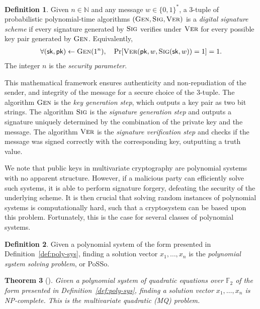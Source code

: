 \documentclass[12pt, a4paper, oneside]{memoir}
\newtheorem{theorem}{Theorem}[section]
\theoremstyle{definition}
\newtheorem{definition}[theorem]{Definition}
\begin{document}
\begin{definition}
  Given $n \in \mathbb{N}$ and any message $w \in \{0, 1\}^{*}$, a $3$-tuple of probabilistic polynomial-time algorithms $(\textsc{Gen}, \textsc{Sig}, \textsc{Ver})$ is a \emph{digital signature scheme} if every signature generated by $\textsc{Sig}$ verifies under $\textsc{Ver}$ for every possible key pair generated by $\textsc{Gen}$. Equivalently,
  \begin{align}
     \forall (\mathsf{sk}, \mathsf{pk}) \leftarrow \textsc{Gen}(1^{n}),
       \quad \Pr[\textsc{Ver}(\mathsf{pk}, w, \textsc{Sig}(\mathsf{sk}, w)) = 1] = 1.
  \end{align}
  The integer $n$ is the \emph{security parameter}.
\end{definition}

This mathematical framework ensures authenticity and non-repudiation of the sender, and integrity of the message for a secure choice of the $3$-tuple. The algorithm $\textsc{Gen}$ is the \emph{key generation step}, which outputs a key pair as two bit strings. The algorithm $\textsc{Sig}$ is the \emph{signature generation step} and outputs a signature uniquely determined by the combination of the private key and the message. The algorithm $\textsc{Ver}$ is the \emph{signature verification step} and checks if the message was signed correctly with the corresponding key, outputting a truth value.

We note that public keys in multivariate cryptography are polynomial systems with no apparent structure. However, if a malicious party can efficiently solve such systems, it is able to perform signature forgery, defeating the security of the underlying scheme. It is then crucial that solving random instances of polynomial systems is computationally hard, such that a cryptosystem can be based upon this problem. Fortunately, this is the case for several classes of polynomial systems.

\begin{definition}\label{def:posso}
  Given a polynomial system of the form presented in Definition~\ref{def:poly-sys}, finding a solution vector $x_{1}, \dots, x_{n}$ is the \emph{polynomial system solving problem}, or \textsf{PoSSo}.
\end{definition}

\begin{theorem}[{\cite[App.~A]{Patarin:199711}}]
  Given a polynomial system of \emph{quadratic equations over $\mathbb{F}_{2}$} of the form presented in Definition~\ref{def:poly-sys}, finding a solution vector $x_{1}, \dots, x_{n}$ is NP-complete. This is the \emph{multivariate quadratic (MQ) problem}.
\end{theorem}
\end{document}
